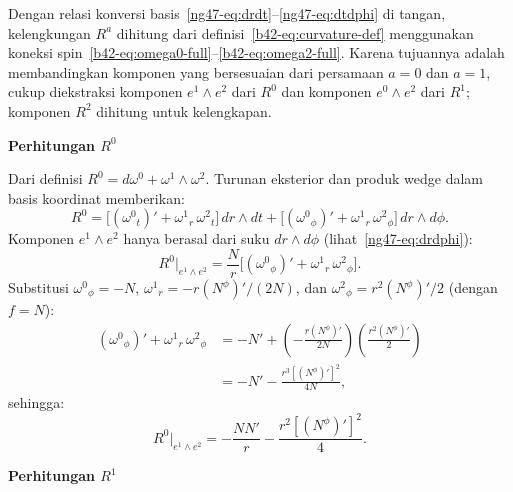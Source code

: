 Dengan relasi konversi basis~\eqref{ng47-eq:drdt}--\eqref{ng47-eq:dtdphi} di tangan, kelengkungan $R^a$ dihitung dari definisi~\eqref{b42-eq:curvature-def} menggunakan koneksi spin~\eqref{b42-eq:omega0-full}--\eqref{b42-eq:omega2-full}. Karena tujuannya adalah membandingkan komponen yang bersesuaian dari persamaan $a = 0$ dan $a = 1$, cukup diekstraksi komponen $e^1 \wedge e^2$ dari $R^0$ dan komponen $e^0 \wedge e^2$ dari $R^1$; komponen $R^2$ dihitung untuk kelengkapan.

\vspace{0.5em}
\noindent \textbf{Perhitungan $R^0$}

Dari definisi $R^0 = d\omega^0 + \omega^1 \wedge \omega^2$. Turunan eksterior dan produk wedge dalam basis koordinat memberikan:
\begin{equation}
    R^0 = \big[(\omega^0{}_t)' + \omega^1{}_r\,\omega^2{}_t\big]\,dr \wedge dt
    + \big[(\omega^0{}_\phi)' + \omega^1{}_r\,\omega^2{}_\phi\big]\,dr \wedge d\phi.
\end{equation}
Komponen $e^1 \wedge e^2$ hanya berasal dari suku $dr \wedge d\phi$ (lihat~\eqref{ng47-eq:drdphi}):
\begin{equation}
    R^0\big|_{e^1 \wedge e^2} = \frac{N}{r}\big[(\omega^0{}_\phi)' + \omega^1{}_r\,\omega^2{}_\phi\big].
\end{equation}
Substitusi $\omega^0{}_\phi = -N$, $\omega^1{}_r = -r(N^\phi)'/(2N)$, dan $\omega^2{}_\phi = r^2(N^\phi)'/2$ (dengan $f = N$):
\begin{align}
    (\omega^0{}_\phi)' + \omega^1{}_r\,\omega^2{}_\phi
    &= -N' + \left(-\frac{r(N^\phi)'}{2N}\right)\!\left(\frac{r^2(N^\phi)'}{2}\right) \nonumber\\[4pt]
    &= -N' - \frac{r^3[(N^\phi)']^2}{4N},
\end{align}
sehingga:
\begin{equation}\label{ng47-eq:R0-12}
    R^0\big|_{e^1 \wedge e^2} = -\frac{NN'}{r} - \frac{r^2[(N^\phi)']^2}{4}.
\end{equation}

\vspace{0.5em}
\noindent \textbf{Perhitungan $R^1$}


